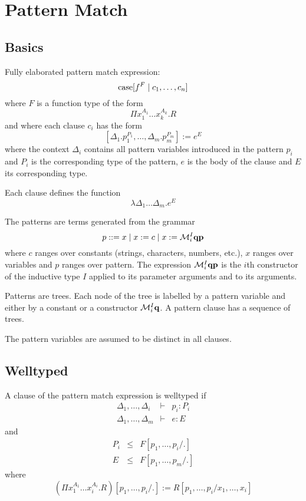 \section{Pattern Match}


\subsection{Basics}

Fully elaborated pattern match expression:
$$
{\text{case}}[ f^F \mid c_1,  \ldots, c_n]
$$
%
where $F$ is a function type of the form
%
$$
\Pi x_1^{A_1} \ldots x_k^{A_k}. R
$$
%
and where each clause $c_i$ has the form
%
$$
    [\Delta_1. p_1^{P_1}, \ldots, \Delta_m. p_m^{P_m}] := e^E
$$
where the context $\Delta_i$ contains all pattern variables introduced in the
pattern $p_i$
and $P_i$ is the corresponding type of the pattern, $e$ is the body of the
clause and $E$ its corresponding type.

Each clause defines the function
$$
\lambda \Delta_1 \ldots \Delta_m. e^E
$$


The patterns are terms generated from the grammar
$$
    p ::= x \mid x := c \mid x := {\cal M}^I_i {\mathbf q} {\mathbf p}
$$
where $c$ ranges over constants (strings, characters, numbers, etc.), $x$ ranges
over variables and $p$ ranges over pattern. The expression ${\cal M}^I_i {\mathbf q}
{\mathbf p}$ is the $i$th constructor of the inductive type $I$ applied to its
parameter arguments and to its arguments.

Patterns are trees. Each node of the tree is labelled by a pattern variable and
either by a constant or a constructor ${\cal M}^I_i {\mathbf q}$. A pattern clause has a
sequence of trees.

The pattern variables are assumed to be distinct in all clauses.



\subsection{Welltyped}

A clause of the pattern match expression is welltyped if
$$
\begin{array}{lll}
    \Delta_1,\ldots,\Delta_i &\vdash& p_i : P_i
    \\
    \Delta_1,\ldots,\Delta_m &\vdash& e : E
\end{array}
$$
%
and
%
$$
\begin{array}{lll}
    P_i &\le& F[p_1,\ldots,p_i / .]
    \\
    E   &\le& F[p_1,\ldots,p_m / .]
\end{array}
$$
%
where
%
$$
    (\Pi x_1^{A_1} \ldots x_i^{A_i} . R)[p_1,\ldots,p_i/.]
    :=
    R[p_1,\ldots,p_i / x_1,\ldots,x_i]
$$




